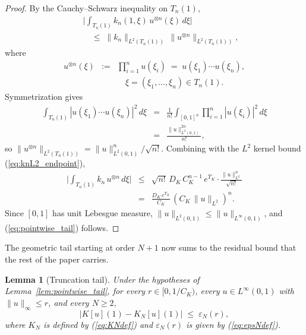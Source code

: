 \documentclass[amsthm]{autart}
\theoremstyle{plain}
\newtheorem{lemma}{Lemma}
\theoremstyle{definition}
\newcommand{\Linf}{L^\infty}
\newcommand{\Ltwo}{L^2}
\newcommand{\eps}{\varepsilon}
\begin{document}
\begin{proof}
By the Cauchy--Schwarz inequality on $T_n(1)$,
\begin{eqnarray}
&& \biggl|\int_{T_n(1)} k_n(1,\xi)\, u^{\otimes n}(\xi)\, d\xi\biggr| \nonumber \\
&& \quad \le\; \|k_n\|_{\Ltwo(T_n(1))}\, \|u^{\otimes n}\|_{\Ltwo(T_n(1))},
\label{eq:CS_step}
\end{eqnarray}
where 
\begin{eqnarray}
u^{\otimes n}(\xi) &:=& \prod_{i=1}^n u(\xi_i) \;=\; u(\xi_1)\cdots u(\xi_n), \nonumber \\
&& \quad \xi = (\xi_1,\ldots,\xi_n) \in T_n(1).
\label{eq:utensor}
\end{eqnarray}
Symmetrization gives
\begin{eqnarray}
\int_{T_n(1)} |u(\xi_1)\cdots u(\xi_n)|^2\, d\xi &=& \frac{1}{n!}\int_{[0,1]^n} \prod_{i=1}^n |u(\xi_i)|^2\, d\xi \nonumber \\
&=& \frac{\|u\|_{\Ltwo(0,1)}^{2n}}{n!},
\label{eq:symmetrization}
\end{eqnarray}
so $\|u^{\otimes n}\|_{\Ltwo(T_n(1))} = \|u\|_{\Ltwo(0,1)}^n / \sqrt{n!}$. Combining with the $\Ltwo$ kernel bound (\ref{eq:knL2_endpoint}),
\begin{eqnarray}
\biggl|\int_{T_n(1)} k_n\, u^{\otimes n}\, d\xi\biggr| &\le& \sqrt{n!}\, D_K\, C_K^{n-1}\, e^{\Upsilon_K}\cdot\frac{\|u\|_{\Ltwo}^n}{\sqrt{n!}} \nonumber \\
&=& \frac{D_K\, e^{\Upsilon_K}}{C_K}\,(C_K\,\|u\|_{\Ltwo})^n.
\label{eq:combined_bound}
\end{eqnarray}
Since $[0,1]$ has unit Lebesgue measure, $\|u\|_{\Ltwo(0,1)} \le \|u\|_{\Linf(0,1)}$, and (\ref{eq:pointwise_tail}) follows.
\end{proof}

The geometric tail starting at order $N+1$ now sums to the residual bound that the rest of the paper carries.

\begin{lemma}[Truncation tail]\label{lem:trunc_tail}
Under the hypotheses of Lemma~\ref{lem:pointwise_tail}, for every $r \in [0, 1/C_K)$, every $u \in \Linf(0,1)$ with $\|u\|_\infty \le r$, and every $N \ge 2$,
\begin{equation}
\bigl|K[u](1) - K_N[u](1)\bigr| \;\le\; \eps_N(r),
\label{eq:trunc_tail}
\end{equation}
where $K_N$ is defined by (\ref{eq:KNdef}) and $\eps_N(r)$ is given by (\ref{eq:epsNdef}).
\end{lemma}
\end{document}
